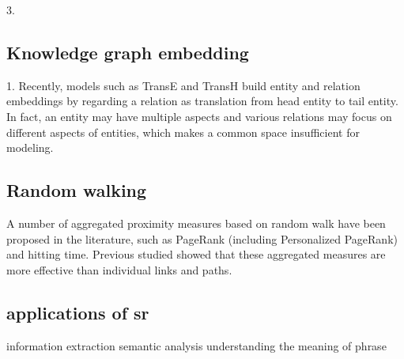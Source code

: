 3. 


\subsection{Knowledge graph embedding}
1. Recently, models such as TransE and TransH build entity and relation embeddings by 
regarding a relation as translation from head entity to tail entity. In fact, an entity
may have multiple aspects and various relations may focus on different aspects of
entities, which makes a common space insufficient for modeling.

\subsection{Random walking}
A number of aggregated proximity measures based on random walk have been proposed in the 
literature, such as PageRank (including Personalized PageRank) and hitting time. Previous
studied showed that these aggregated measures are more effective than individual links 
and paths.

\subsection{applications of sr}
information extraction
semantic analysis
understanding the meaning of phrase